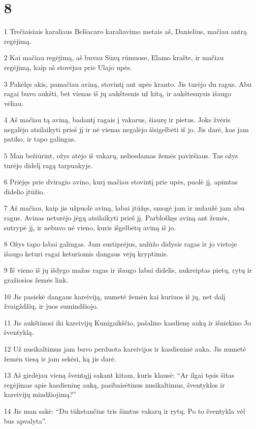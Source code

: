 \chapter{8}


\par 1 Trečiaisiais karaliaus Belšacaro karaliavimo metais aš, Danielius, mačiau antrą regėjimą. 
\par 2 Kai mačiau regėjimą, aš buvau Sūzų rūmuose, Elamo krašte, ir mačiau regėjimą, kaip aš stovėjau prie Ulajo upės. 
\par 3 Pakėlęs akis, pamačiau aviną, stovintį ant upės kranto. Jis turėjo du ragus. Abu ragai buvo aukšti, bet vienas iš jų aukštesnis už kitą, ir aukštesnysis išaugo vėliau. 
\par 4 Aš mačiau tą aviną, badantį ragais į vakarus, šiaurę ir pietus. Joks žvėris negalėjo atsilaikyti prieš jį ir nė vienas negalėjo išsigelbėti iš jo. Jis darė, kas jam patiko, ir tapo galingas. 
\par 5 Man bežiūrint, ožys atėjo iš vakarų, neliesdamas žemės paviršiaus. Tas ožys turėjo didelį ragą tarpuakyje. 
\par 6 Priėjęs prie dviragio avino, kurį mačiau stovintį prie upės, puolė jį, apimtas didelio įtūžio. 
\par 7 Aš mačiau, kaip jis užpuolė aviną, labai įtūžęs, smogė jam ir nulaužė jam abu ragus. Avinas neturėjo jėgų atsilaikyti prieš jį. Parbloškęs aviną ant žemės, sutrypė jį, ir nebuvo nė vieno, kuris išgelbėtų aviną iš jo. 
\par 8 Ožys tapo labai galingas. Jam sustiprėjus, nulūžo didysis ragas ir jo vietoje išaugo keturi ragai keturiomis dangaus vėjų kryptimis. 
\par 9 Iš vieno iš jų išdygo mažas ragas ir išaugo labai didelis, nukreiptas pietų, rytų ir gražiosios žemės link. 
\par 10 Jis pasiekė dangaus kareiviją, numetė žemėn kai kuriuos iš jų, net dalį žvaigždžių, ir juos sumindžiojo. 
\par 11 Jis aukštinosi iki kareivijų Kunigaikščio, pašalino kasdienę auką ir išniekino Jo šventyklą. 
\par 12 Už nusikaltimus jam buvo perduota kareivijos ir kasdieninė auka. Jis numetė žemėn tiesą ir jam sekėsi, ką jis darė. 
\par 13 Aš girdėjau vieną šventąjį sakant kitam, kuris klausė: “Ar ilgai tęsis šitas regėjimas apie kasdieninę auką, pasibaisėtinus nusikaltimus, šventyklos ir kareivijų mindžiojimą?” 
\par 14 Jis man sakė: “Du tūkstančius tris šimtus vakarų ir rytų. Po to šventykla vėl bus apvalyta”. 
